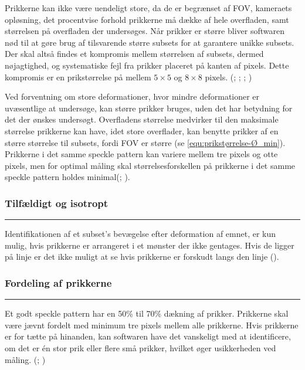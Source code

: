 Prikkerne kan ikke være uendeligt store, da de er begrænset af FOV, kameraets opløsning, det procentvise forhold prikkerne må dække af hele overfladen, samt størrelsen på overfladen der undersøges. Når prikker er større bliver softwaren nød til at gøre brug af tilsvarende større subsets for at garantere unikke subsets. Der skal altså findes et kompromis mellem størrelsen af subsets, dermed nøjagtighed, og systematiske fejl fra prikker placeret på kanten af pixels. Dette kompromis er en prikstørrelse på mellem $5 \times 5$ og $8 \times 8$ pixels. (\cite{Haddadi2008UseTechnique}; \cite{Crammond2013SpeckleCorrelation}; \cite{Dong2017ACorrelation};  \cite{Gagnon2024ThePatterns})


Ved forventning om store deformationer, hvor mindre deformationer er uvæsentlige at undersøge, kan større prikker bruges, uden det har betydning for det der ønskes undersøgt. Overfladens størrelse medvirker til den maksimale størrelse prikkerne kan have, idet store overflader, kan benytte prikker af en større størrelse til subsets, fordi FOV er større (se \ref{equ:prikstørrelse-Ø_min}). Prikkerne i det samme speckle pattern kan variere mellem tre pixels og otte pixels, men for optimal måling skal størrelsesforskellen på prikkerne i det samme speckle pattern holdes minimal(\cite{Crammond2013SpeckleCorrelation}; \cite{Gagnon2024ThePatterns}).  

\subsubsection{Tilfældigt og isotropt}\plainbreak{-0.4}
Identifikationen af et subset's bevægelse efter deformation af emnet, er kun mulig, hvis prikkerne er arrangeret i et mønster der ikke gentages. Hvis de ligger på linje er det ikke muligt at se hvis prikkerne er forskudt langs den linje (\cite{Zaya2023ApplicationReview}).

\subsubsection{Fordeling af prikkerne}\plainbreak{-0.4}
Et godt speckle pattern har en 50\% til 70\% dækning af prikker. Prikkerne skal være jævnt fordelt med minimum tre pixels mellem alle prikkerne. Hvis prikkerne er for tætte på hinanden, kan softwaren have det vanskeligt med at identificere, om det er én stor prik eller flere små prikker, hvilket øger usikkerheden ved måling. (\cite{Reu2015AllDensity}; \cite{Caliskan2024InvestigationDIC})

